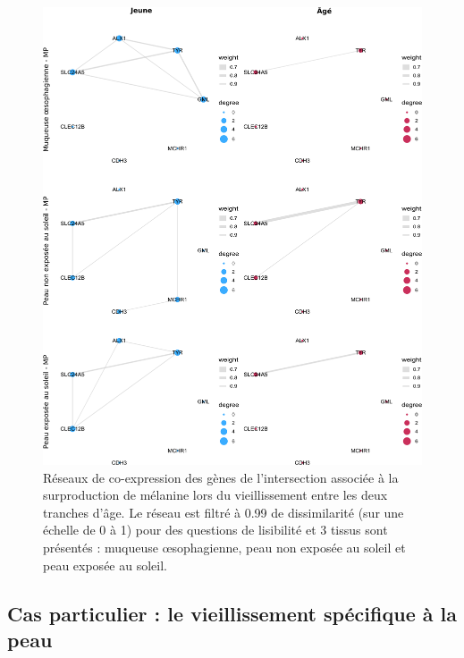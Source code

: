 \begin{figure}[p]
    \centering
    \includegraphics[width=1\textwidth]{img/chap2/chap2_plot_intersect_melanin.pdf}
    \caption[Réseaux de co-expression des gènes de l'intersection associée à la surproduction de mélanine lors du vieillissement entre les deux tranches d'âge]{Réseaux de co-expression des gènes de l'intersection associée à la surproduction de mélanine lors du vieillissement entre les deux tranches d'âge. Le réseau est filtré à 0.99 de dissimilarité (sur une échelle de 0 à 1) pour des questions de lisibilité et 3 tissus sont présentés : muqueuse œsophagienne, peau non exposée au soleil et peau exposée au soleil.}
    \label{figure:graphs_intersection_melanine}
\end{figure}


\subsection{Cas particulier : le vieillissement spécifique à la peau}

